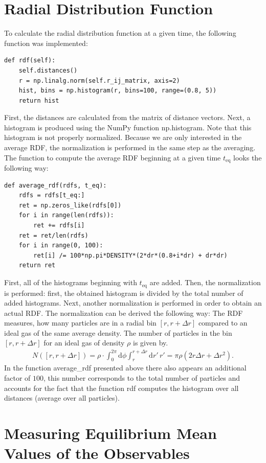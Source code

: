 \documentclass[a4paper,10pt,bibtotoc]{scrartcl}
\begin{document}
\section{Radial Distribution Function}
To calculate the radial distribution function at a given time, the following function was implemented:
\begin{lstlisting}
def rdf(self):
    self.distances()
    r = np.linalg.norm(self.r_ij_matrix, axis=2)
    hist, bins = np.histogram(r, bins=100, range=(0.8, 5))
    return hist
\end{lstlisting}
First, the distances are calculated from the matrix of distance vectors. 
Next, a histogram is produced using the NumPy function np.histogram. 
Note that this histogram is not properly normalized. 
Because we are only interested in the average RDF, the normalization is performed in the same step as the averaging.
The function to compute the average RDF beginning at a given time $t_\mathrm{eq}$ looks the following way:
\begin{lstlisting}
def average_rdf(rdfs, t_eq):
    rdfs = rdfs[t_eq:]
    ret = np.zeros_like(rdfs[0])
    for i in range(len(rdfs)):
        ret += rdfs[i]
    ret = ret/len(rdfs)
    for i in range(0, 100):
        ret[i] /= 100*np.pi*DENSITY*(2*dr*(0.8+i*dr) + dr*dr)
    return ret
\end{lstlisting}
First, all of the histograms beginning with $t_\mathrm{eq}$ are added. 
Then, the normalization is performed: first, the obtained histogram is divided by the total number of added histograms. 
Next, another normalization is performed in order to obtain an actual RDF.
The normalization can be derived the following way: The RDF measures, how many particles are in a radial bin $[r,r+\Delta r]$ compared to an ideal gas of the same average density.
The number of particles in the bin $[r,r+\Delta r]$ for an ideal gas of density $\rho$ is given by.
\begin{align}
N\left([r,r+\Delta r]\right) = \rho\cdot\int_{0}^{2\pi}\mathrm{d}\phi\int_{r}^{r+\Delta r}\mathrm{d}r'\, r' = \pi \rho\left(2r\Delta r + \Delta r^2\right).
\end{align}
In the function average\_rdf presented above there also appears an additional factor of $100$, this number corresponds to the total number of particles and accounts for the fact that the function rdf computes the histogram over all distances (average over all particles).

\newpage
\section{Measuring Equilibrium Mean Values of the Observables}
\end{document}
